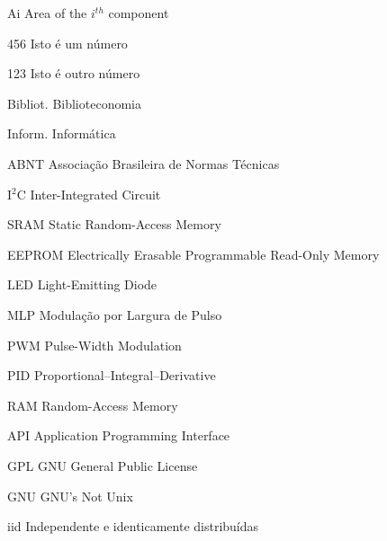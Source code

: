 \begin{siglas}
\item[Ai] Area of the $i^{th}$ component
\item[456] Isto é um número
\item[123] Isto é outro número
\item [Bibliot.] Biblioteconomia
\item [Inform.]  Informática
\item [ABNT] Associação Brasileira de Normas Técnicas
\item [I$^2$C] Inter-Integrated Circuit
\item [SRAM] Static Random-Access Memory
\item [EEPROM]  Electrically Erasable Programmable Read-Only Memory
\item [LED] Light-Emitting Diode
\item [MLP] Modulação por Largura de Pulso
\item [PWM] Pulse-Width Modulation
\item [PID] Proportional–Integral–Derivative
\item [RAM] Random-Access Memory
\item [API] Application Programming Interface
\item [GPL] GNU General Public License
\item [GNU] GNU's Not Unix
\item [iid] Independente e identicamente distribuídas
\end{siglas}